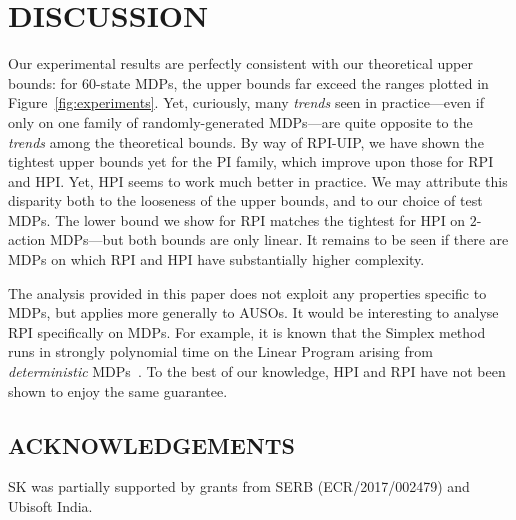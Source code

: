\vspace{-10pt}
\section{DISCUSSION}
\label{sec:conclusion}
Our experimental results are perfectly consistent with our theoretical upper bounds: for $60$-state MDPs, the upper bounds far exceed the ranges plotted in Figure~\ref{fig:experiments}. Yet, curiously, many \textit{trends} seen in practice---even if only on one family of randomly-generated MDPs---are quite opposite to the \textit{trends} among the theoretical bounds. By way of RPI-UIP, we have shown the tightest upper bounds yet for the PI family, which improve upon those for RPI and HPI. Yet, HPI seems to work much better in practice. We may attribute this disparity both to the looseness of the upper bounds, and to our choice of test MDPs. The lower bound we show for RPI matches the tightest for HPI on $2$-action MDPs---but both bounds are only linear. It remains to be seen if there are MDPs on which RPI and HPI have substantially higher complexity.


The analysis provided in this paper does not exploit any properties specific to MDPs, but applies more generally to AUSOs. It would be interesting to analyse RPI specifically on MDPs. For example, it is known that the Simplex method runs in strongly polynomial time on the Linear Program arising from \textit{deterministic} MDPs~\cite{Post+Ye:2013}. To the best of our knowledge,  HPI and RPI have not been shown to enjoy the same guarantee.
\vspace{-10pt}
\subsection*{ACKNOWLEDGEMENTS}
SK was partially supported by   grants from SERB (ECR/2017/002479) and Ubisoft India.
  







